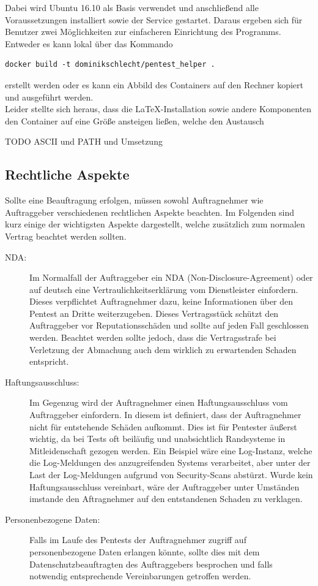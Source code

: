 Dabei wird Ubuntu 16.10 als Basis verwendet und anschließend alle Voraussetzungen installiert sowie der Service gestartet. Daraus ergeben sich für Benutzer zwei Möglichkeiten zur einfacheren Einrichtung des Programms. Entweder es kann lokal über das Kommando
\begin{lstlisting}
docker build -t dominikschlecht/pentest_helper .
\end{lstlisting}
erstellt werden oder es kann ein Abbild des Containers auf den Rechner kopiert und ausgeführt werden.\\

Leider stellte sich heraus, dass die LaTeX-Installation sowie andere Komponenten den Container auf eine Größe ansteigen ließen, welche den Austausch 

TODO ASCII und PATH und Umsetzung

	\subsection{Rechtliche Aspekte}
	Sollte eine Beauftragung erfolgen, müssen sowohl Auftragnehmer wie Auftraggeber  verschiedenen rechtlichen Aspekte beachten. Im Folgenden sind kurz einige der wichtigsten Aspekte dargestellt, welche zusätzlich zum normalen Vertrag beachtet werden sollten.\\
	
\begin{description}
	\item[NDA: ] Im Normalfall der Auftraggeber ein NDA (Non-Disclosure-Agreement) oder auf deutsch eine Vertraulichkeitserklärung vom Dienstleister einfordern. Dieses verpflichtet Auftragnehmer dazu, keine Informationen über den Pentest an Dritte weiterzugeben. Dieses Vertragsstück schützt den Auftraggeber vor Reputationsschäden und sollte auf jeden Fall geschlossen werden. Beachtet werden sollte jedoch, dass die Vertragsstrafe bei Verletzung der Abmachung auch dem wirklich zu erwartenden Schaden entspricht.
	\item[Haftungsausschluss: ] Im Gegenzug wird der Auftragnehmer einen Haftungsausschluss vom Auftraggeber einfordern. In diesem ist definiert, dass der Auftragnehmer nicht für entstehende Schäden aufkommt. Dies ist für Pentester äußerst wichtig, da bei Tests oft beiläufig und unabsichtlich Randsysteme in Mitleidenschaft gezogen werden. Ein Beispiel wäre eine Log-Instanz, welche die Log-Meldungen des anzugreifenden Systems verarbeitet, aber unter der Last der Log-Meldungen aufgrund von Security-Scans abstürzt. Wurde kein Haftungsausschluss vereinbart, wäre der Auftraggeber unter Umständen imstande den Aftragnehmer auf den entstandenen Schaden zu verklagen. 
	\item[Personenbezogene Daten: ] Falls im Laufe des Pentests der Auftragnehmer zugriff auf personenbezogene Daten erlangen könnte, sollte dies mit dem Datenschutzbeauftragten des Auftraggebers besprochen und falls notwendig entsprechende Vereinbarungen getroffen werden.
\end{description}


